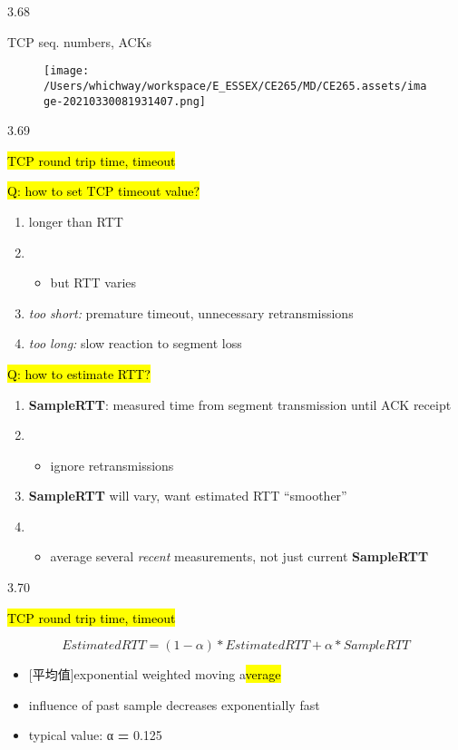 \documentclass[
]{article}
\begin{document}
3.68

TCP seq. numbers, ACKs

\begin{figure}
\centering
\texttt{[image: /Users/whichway/workspace/E\_ESSEX/CE265/MD/CE265.assets/image-20210330081931407.png]}
\caption{}
\end{figure}

3.69

\hl{TCP round trip time, timeout}

\hl{Q: how to set TCP timeout value?}

\begin{enumerate}
\def\labelenumi{\arabic{enumi}.}
\item
  longer than RTT
\item
  \begin{itemize}
  \item
    but RTT varies
  \end{itemize}
\item
  \emph{too short:} premature timeout, unnecessary retransmissions
\item
  \emph{too long:} slow reaction to segment loss
\end{enumerate}

\hl{Q: how to estimate RTT?}

\begin{enumerate}
\def\labelenumi{\arabic{enumi}.}
\item
  \textbf{SampleRTT}: measured time from segment transmission until ACK
  receipt
\item
  \begin{itemize}
  \item
    ignore retransmissions
  \end{itemize}
\item
  \textbf{SampleRTT} will vary, want estimated RTT ``smoother''
\item
  \begin{itemize}
  \item
    average several \emph{recent} measurements, not just current
    \textbf{SampleRTT}
  \end{itemize}
\end{enumerate}

3.70

\hl{TCP round trip time, timeout}

\[EstimatedRTT = (1- α)*EstimatedRTT + α*SampleRTT\]

\begin{itemize}
\item
  {[}平均值{]}exponential weighted moving a\hl{verage}
\item
  influence of past sample decreases exponentially fast
\item
  typical value: α \textbf{=} 0.125
\end{itemize}
\end{document}
